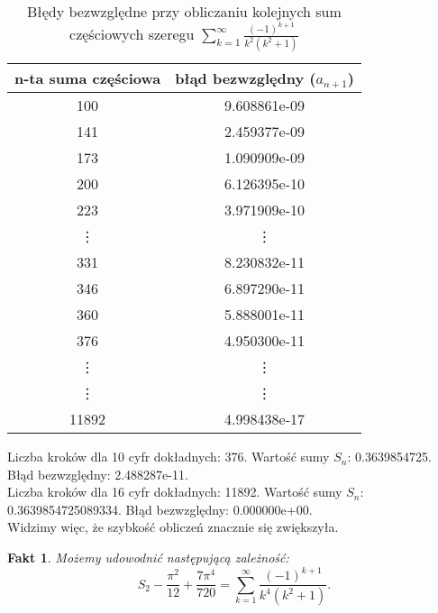 \documentclass{article}
\newtheorem{fakt}{Fakt}
\begin{document}
\begin{table}[h]
	\centering
	\begin{tabular}{|c|c|} \hline
		n-ta suma częściowa & błąd bezwzględny ($a_{n+1}$) \\ \hline
		100 &  9.608861e-09\\
		141 &  2.459377e-09\\
		173 &  1.090909e-09\\
		200 &  6.126395e-10\\
		223 &  3.971909e-10\\
		\vdots & \vdots \\
		331  &  8.230832e-11 \\
		346 &  6.897290e-11 \\
		360 & 5.888001e-11\\
		376 & 4.950300e-11\\
		\vdots & \vdots \\
		\vdots & \vdots \\
		11892 & 4.998438e-17\\
		\hline
	\end{tabular}
	\caption{Błędy bezwzględne przy obliczaniu kolejnych sum częściowych szeregu $\sum_{k=1}^{\infty}\frac{(-1)^{k+1}}{k^2(k^2+1)}$}
\end{table}

Liczba kroków dla 10 cyfr dokładnych: 376.	Wartość sumy $S_n$: 0.3639854725.	Błąd bezwzględny: 2.488287e-11.\\
Liczba kroków dla 16 cyfr dokładnych: 11892.	Wartość sumy $S_n$: 0.3639854725089334.	Błąd bezwzględny: 0.000000e+00.\\
Widzimy więc, że szybkość obliczeń znacznie się zwiększyła.\\

\begin{fakt}
Możemy udowodnić następującą zależność:
\begin{equation}
 S_{2} - \frac{\pi^{2}}{12} + \frac{7\pi^{4}}{720} = \displaystyle\sum_{k=1}^{\infty}\frac{(-1)^{k+1}}{k^4(k^2+1)}.
\end{equation}
\end{fakt}
\end{document}
